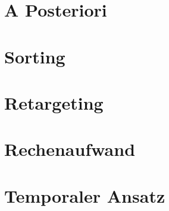 \newpage
\section{A Posteriori}
\label{ch:Content2:sec:a Posteriori}




\newpage
\section{Sorting}
\label{ch:Content2:sec:Sorting}




\newpage
\section{Retargeting}
\label{ch:Content2:sec:Retargeting}



\newpage
\section{Rechenaufwand}
\label{ch:Content2:sec:Rechenaufwand}


\newpage
\section{Temporaler Ansatz}
\label{ch:Content2:sec:Temporaler Ansatz}




